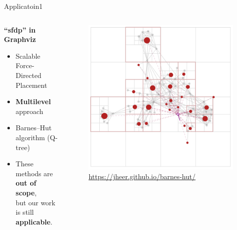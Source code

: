 \documentclass[dvipdfmx,13pt,aspectratio=169]{beamer}
\newif\ifShowHidden
\begin{document}
\ifShowHidden
  \begin{frame}{Applicatoin1}
    \begin{columns}
      \begin{column}{0.4\columnwidth}
        \textbf{``sfdp'' in Graphviz}
        \begin{itemize}
          \item Scalable Force-Directed Placement
          \item \textbf{Multilevel} approach
          \item Barnes--Hut algorithm (Q-tree)\cite{Hu2006EfficientHF}
                \cite{barnesHierarchicalLogForcecalculation1986}
          \item These methods are\\\textbf{out of scope},\\
                but our work is still \textbf{applicable}.
        \end{itemize}
      \end{column}
      \begin{column}{0.6\columnwidth}
        \begin{figure}[htbp]
          \centering
          \includegraphics[width=0.7\columnwidth]{imgs/BH.png}
          \caption{\footnotesize{\url{https://jheer.github.io/barnes-hut/}}}
        \end{figure}
      \end{column}
    \end{columns}



\end{frame}
\end{document}
